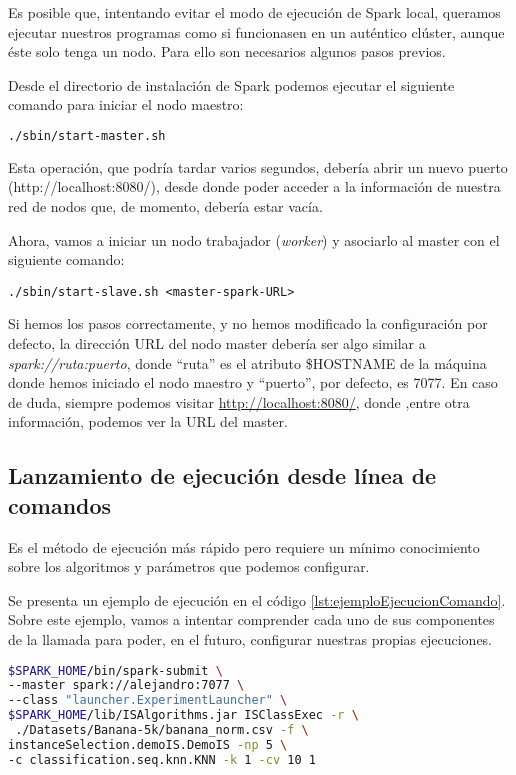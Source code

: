 Es posible que, intentando evitar el modo de ejecución de Spark local, queramos ejecutar nuestros programas como si funcionasen en un auténtico clúster, aunque éste solo tenga un nodo. Para ello son necesarios algunos pasos previos.


Desde el directorio de instalación de Spark podemos ejecutar el siguiente comando para iniciar el nodo maestro:

\begin{lstlisting}[language=bash,label=lst:ejemploEjecucionComando]
./sbin/start-master.sh
\end{lstlisting}

Esta operación, que podría tardar varios segundos, debería abrir un nuevo puerto (http://localhost:8080/), desde donde poder acceder a la información de nuestra red de nodos que, de momento, debería estar vacía.

Ahora, vamos a iniciar un nodo trabajador (\textit{worker}) y asociarlo al master con el siguiente comando:

\begin{lstlisting}
./sbin/start-slave.sh <master-spark-URL>
\end{lstlisting}

Si hemos los pasos correctamente, y no hemos modificado la configuración por defecto, la dirección URL del nodo master debería ser algo similar a \textit{spark://ruta:puerto}, donde ``ruta'' es el atributo \$HOSTNAME de la máquina donde hemos iniciado el nodo maestro y ``puerto'', por defecto, es 7077. En caso de duda, siempre podemos visitar \url{http://localhost:8080/}, donde ,entre otra información, podemos ver la URL del master.


\subsection{Lanzamiento de ejecución desde línea de comandos}

Es el método de ejecución más rápido pero requiere un mínimo conocimiento sobre los algoritmos y parámetros que podemos configurar.

Se presenta un ejemplo de ejecución en el código \ref{lst:ejemploEjecucionComando}. Sobre este ejemplo, vamos a intentar comprender cada uno de sus componentes de la llamada para poder, en el futuro, configurar nuestras propias ejecuciones. 

\begin{lstlisting}[language=bash,label=lst:ejemploEjecucionComando,caption=Ejemplo de ejecución desde línea de comandos,captionpos=b]
$SPARK_HOME/bin/spark-submit \
--master spark://alejandro:7077 \
--class "launcher.ExperimentLauncher" \
$SPARK_HOME/lib/ISAlgorithms.jar ISClassExec -r \
 ./Datasets/Banana-5k/banana_norm.csv -f \
instanceSelection.demoIS.DemoIS -np 5 \
-c classification.seq.knn.KNN -k 1 -cv 10 1
\end{lstlisting}

